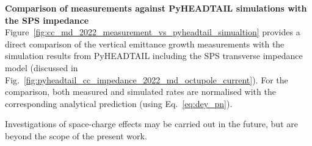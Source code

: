 \textbf{Comparison of measurements against PyHEADTAIL simulations with the SPS impedance}\\

Figure~\ref{fig:cc_md_2022_measurement_vs_pyheadtail_simualtion} provides a direct comparison of the vertical emittance growth measurements with the simulation results from PyHEADTAIL including the SPS transverse impedance model (discussed in Fig.~\ref{fig:pyheadtail_cc_impedance_2022_md_octupole_current}). For the comparison, both measured and simulated rates are normalised with the corresponding analytical prediction (using Eq.~\eqref{eq:dey_pn}). 



Investigations of space-charge effects may be carried out in the future, but are beyond the scope of the present work.



